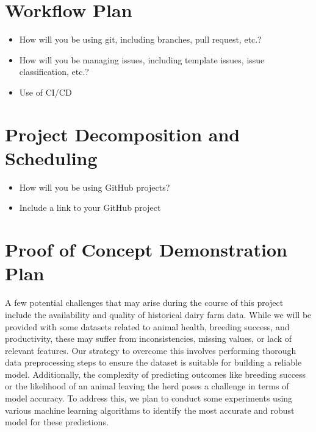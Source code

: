 \documentclass{article}
\begin{document}
\section{Workflow Plan}

\begin{itemize}
	\item How will you be using git, including branches, pull request, etc.?
	\item How will you be managing issues, including template issues, issue
	classification, etc.?
  \item Use of CI/CD
\end{itemize}

\section{Project Decomposition and Scheduling}

\begin{itemize}
  \item How will you be using GitHub projects?
  \item Include a link to your GitHub project
\end{itemize}


\section{Proof of Concept Demonstration Plan}

A few potential challenges that may arise during the course of this project include the availability and quality of historical dairy farm data. While we will be provided with some datasets related to animal health, breeding success, and productivity, these may suffer from inconsistencies, missing values, or lack of relevant features. Our strategy to overcome this involves performing thorough data preprocessing steps to ensure the dataset is suitable for building a reliable model. Additionally, the complexity of predicting outcomes like breeding success or the likelihood of an animal leaving the herd poses a challenge in terms of model accuracy. To address this, we plan to conduct some experiments using various machine learning algorithms to identify the most accurate and robust model for these predictions.
\end{document}

